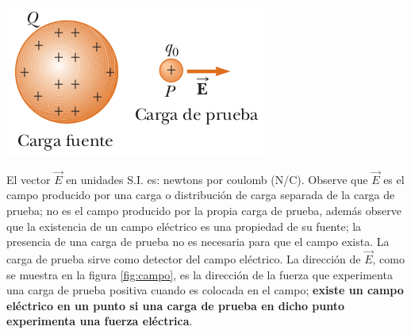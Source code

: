 \documentclass{article}
\begin{document}
\begin{center}
	\includegraphics[scale=0.50]{figuras/campo-1.png}
\label{fig:campo}
\end{center}

El vector $\vec{E}$ en unidades S.I. es: newtons por coulomb (N/C). Observe que $\vec{E}$ es el campo producido por una carga o distribución de carga separada de la carga de prueba; no es el campo producido por la propia carga de prueba, además observe que la existencia de un campo eléctrico es una propiedad de su fuente; la presencia de una carga de prueba no es necesaria para que el campo exista. La carga de prueba sirve como detector del campo eléctrico. La dirección de $\vec{E}$, como se muestra en la figura \ref{fig:campo}, es la dirección de la fuerza que experimenta una carga de prueba positiva cuando es colocada en el campo; \textbf{existe un campo eléctrico en un punto si una carga de prueba en dicho punto experimenta una fuerza eléctrica}.


\end{document}
